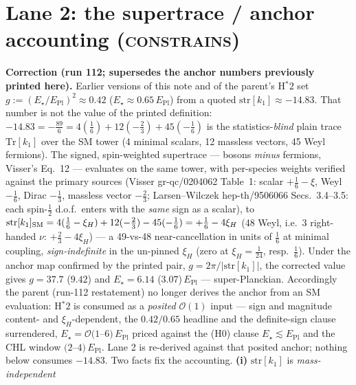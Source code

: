 \documentclass[11pt]{article}
\newcommand{\Epl}{E_{\mathrm{Pl}}}
\newcommand{\str}{\mathrm{str}}
\newcommand{\cons}{{\normalfont\scshape constrains}}
\begin{document}
\section{Lane 2: the supertrace / anchor accounting (\cons)}\label{sec:supertrace}
\noindent\textbf{Correction (run 112; supersedes the anchor numbers previously printed
here).} Earlier versions of this note and of the parent's H$^{*}2$ set
$g:=(E_\star/\Epl)^2\approx0.42$ ($E_\star\approx0.65\,\Epl$) from a quoted
$\str[k_1]\approx-14.83$. That number is not the value of the printed definition:
$-14.83=-\tfrac{89}{6}=4(\tfrac16)+12(-\tfrac23)+45(-\tfrac16)$ is the
statistics-\emph{blind} plain trace $\mathrm{Tr}[k_1]$ over the SM tower (4 minimal scalars,
12 massless vectors, 45 Weyl fermions). The signed, spin-weighted supertrace --- bosons
\emph{minus} fermions, Visser's Eq.~12 --- evaluates on the same tower, with per-species
weights verified against the primary sources (Visser gr-qc/0204062 Table~1: scalar
$+\tfrac16-\xi$, Weyl $-\tfrac16$, Dirac $-\tfrac13$, massless vector $-\tfrac23$;
Larsen--Wilczek hep-th/9506066 Secs.~3.4--3.5: each spin-$\tfrac12$ d.o.f.\ enters with the
\emph{same} sign as a scalar), to
$\str[k_1]_{\rm SM}=4(\tfrac16-\xi_H)+12(-\tfrac23)-45(-\tfrac16)=+\tfrac16-4\xi_H$ (48
Weyl, i.e.\ 3 right-handed $\nu$: $+\tfrac23-4\xi_H$) --- a 49-vs-48 near-cancellation in
units of $\tfrac16$ at minimal coupling, \emph{sign-indefinite} in the un-pinned $\xi_H$
(zero at $\xi_H=\tfrac1{24}$, resp.\ $\tfrac16$). Under the anchor map confirmed by the
printed pair, $g=2\pi/|\str[k_1]|$, the corrected value gives $g=37.7$ ($9.42$) and
$E_\star=6.14$ ($3.07$)\,$\Epl$ --- super-Planckian. Accordingly the parent (run-112
restatement) no longer derives the anchor from an SM evaluation: H$^{*}2$ is consumed as a
\emph{posited} $\mathcal O(1)$ input --- sign and magnitude content- and $\xi_H$-dependent,
the $0.42/0.65$ headline and the definite-sign clause surrendered, $E_\star=\mathcal
O(1$--$6)\,\Epl$ priced against the (H0) clause $E_\star\lesssim\Epl$ and the CHL window
$(2$--$4)\,\Epl$. Lane 2 is re-derived against that posited anchor; nothing below consumes
$-14.83$.
Two facts fix the accounting. \textbf{(i)} $\str[k_1]$ is \emph{mass-independent}
\end{document}
